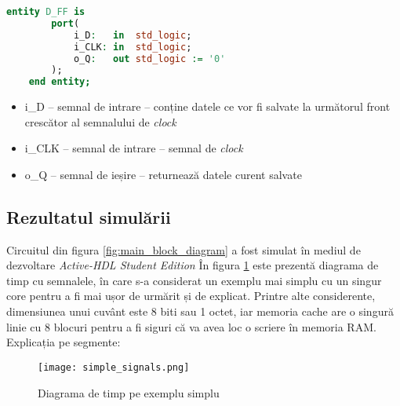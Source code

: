 \documentclass[../main.tex]{subfiles}
\begin{document}
\begin{lstlisting}[language=VHDL, caption={Entitatea bistabilului tip D}, label={lst:flipflopd}]
    entity D_FF is
        port(
            i_D:   in  std_logic;
            i_CLK: in  std_logic;
            o_Q:   out std_logic := '0'
        );
    end entity;
\end{lstlisting}

\begin{itemize}
    \item i\_D -- semnal de intrare -- conține datele ce vor fi salvate la următorul front crescător al semnalului de \emph{clock}
    \item i\_CLK -- semnal de intrare -- semnal de \emph{clock}
    \item o\_Q -- semnal de ieșire -- returnează datele curent salvate
\end{itemize}

\subsection{Rezultatul simulării}
Circuitul din figura \ref{fig:main_block_diagram} a fost simulat în mediul de dezvoltare \emph{Active-HDL Student Edition}
În figura \ref{fig:simple_signals} este prezentă diagrama de timp cu semnalele, în care s-a considerat un exemplu mai simplu
cu un singur core pentru a fi mai ușor de urmărit și de explicat. Printre alte considerente, dimensiunea unui cuvânt este
8 biti sau 1 octet, iar memoria cache are o singură linie cu 8 blocuri pentru a fi siguri că va avea loc o scriere în memoria
RAM. Explicația pe segmente:

\begin{figure}[h]
    \centering
    \texttt{[image: simple\_signals.png]}
    \caption{Diagrama de timp pe exemplu simplu}
    \label{fig:simple_signals}
\end{figure}
\end{document}
